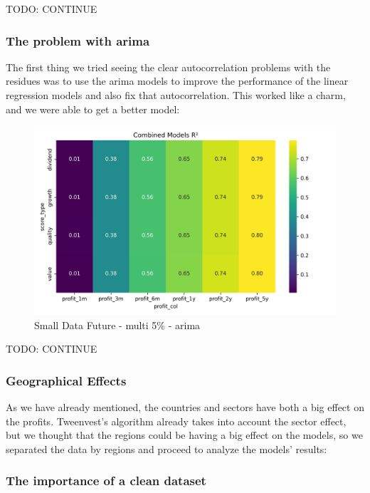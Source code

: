 \documentclass[11pt,english,a4paper,hidelinks]{book}
\begin{document}
TODO: CONTINUE

    
\subsubsection{The problem with \acrshort{arima}}

\noindent The first thing we tried seeing the clear autocorrelation problems with the residues was to use the \acrshort{arima} models to improve the performance of the linear regression models and also fix that autocorrelation. This worked like a charm, and we were able to get a better model:


\begin{figure}[H]
    \centering
    \includegraphics[width=1\textwidth]{images/code/models/linear_regression/ARIMA_performance.png}
    \caption{Small Data Future - \acrshort{multi} 5\% - \acrshort{arima}}
    \label{fig:arima_linear_regression}
\end{figure}

TODO: CONTINUE

\subsubsection{Geographical Effects}

\noindent As we have already mentioned, the countries and sectors have both a big effect on the profits. Tweenvest's algorithm already takes into account the sector effect, but we thought that the regions could be having a big effect on the models, so we separated the data by regions and proceed to analyze the models' results:


\subsubsection{The importance of a clean dataset}
\end{document}
